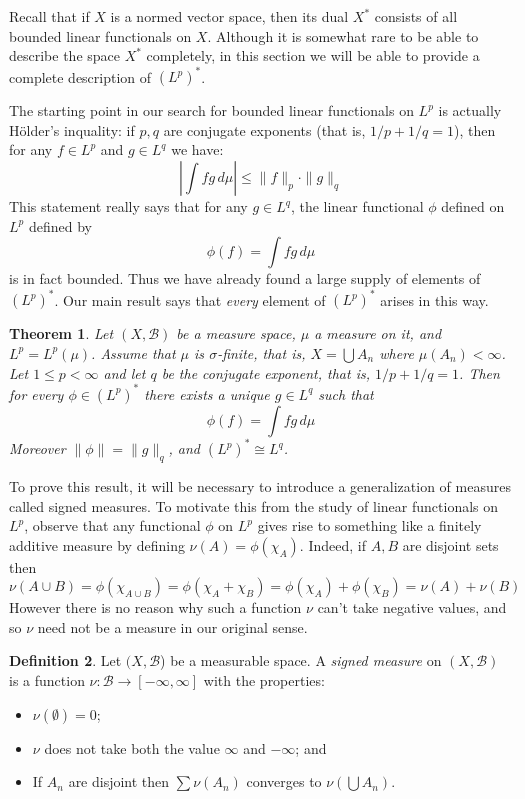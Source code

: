 \documentclass[11pt,oneside]{amsbook}
\theoremstyle{definition}
\theoremstyle{plain}
\newtheorem{thm}{Theorem}[section]
\theoremstyle{definition}
\newtheorem{defn}[thm]{Definition}
\theoremstyle{remark}
\numberwithin{equation}{section}
\numberwithin{figure}{section}
\begin{document}
Recall that if $X$ is a normed vector space, then its dual $X^*$ consists of all bounded linear functionals on $X$. Although it is somewhat rare to be able to describe the space $X^*$ completely, in this section we will be able to provide a complete description of $(L^p)^*$.

The starting point in our search for bounded linear functionals on $L^p$ is actually H\"older's inquality: if $p,q$ are conjugate exponents (that is, $1/p+1/q=1$), then for any $f\in L^p$ and $g\in L^q$ we have:
\[\left|\int fg\,d\mu\right|\leq\|f\|_p\cdot\|g\|_q
\]
This statement really says that for any $g\in L^q$, the linear functional $\phi$ defined on $L^p$ defined by
\[\phi(f)=\int fg\,d\mu
\]
is in fact bounded. Thus we have already found a large supply of elements of $(L^p)^*$. Our main result says that \emph{every} element of $(L^p)^*$ arises in this way.

\begin{thm}
  \label{thm:lpdual}
  Let $(X,\mathcal B)$ be a measure space, $\mu$ a measure on it, and $L^p=L^p(\mu)$. Assume that $\mu$ is $\sigma$-finite, that is, $X=\bigcup A_n$ where $\mu(A_n)<\infty$. Let $1\leq p<\infty$ and let $q$ be the conjugate exponent, that is, $1/p+1/q=1$. Then for every $\phi\in(L^p)^*$ there exists a unique $g\in L^q$ such that
  \[\phi(f)=\int fg\,d\mu
  \]
  Moreover $\|\phi\|=\|g\|_q$, and $(L^p)^*\cong L^q$.
\end{thm}

To prove this result, it will be necessary to introduce a generalization of measures called signed measures. To motivate this from the study of linear functionals on $L^p$, observe that any functional $\phi$ on $L^p$ gives rise to something like a finitely additive measure by defining $\nu(A)=\phi(\chi_A)$. Indeed, if $A,B$ are disjoint sets then
\[\nu(A\cup B)=\phi(\chi_{A\cup B})=\phi(\chi_A+\chi_B)
  =\phi(\chi_A)+\phi(\chi_B)=\nu(A)+\nu(B)
\]
However there is no reason why such a function $\nu$ can't take negative values, and so $\nu$ need not be a measure in our original sense.

\begin{defn}
  Let $(X,\mathcal B$) be a measurable space. A \emph{signed measure} on $(X,\mathcal B)$ is a function $\nu\colon\mathcal B\to[-\infty,\infty]$ with the properties:
  \begin{itemize}
  \item $\nu(\emptyset)=0$;
  \item $\nu$ does not take both the value $\infty$ and $-\infty$; and
  \item If $A_n$ are disjoint then $\sum\nu(A_n)$ converges to $\nu(\bigcup A_n)$.
  \end{itemize}
\end{defn}
\end{document}
